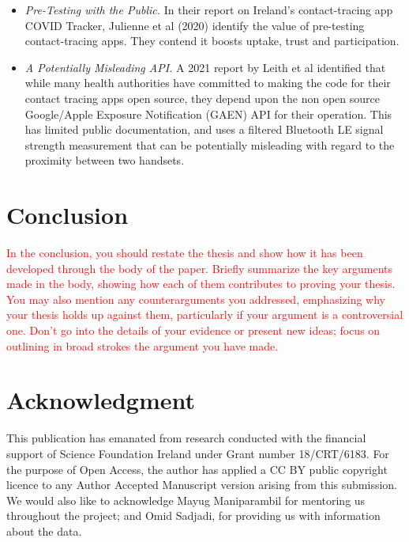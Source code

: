 \documentclass[conference]{IEEEtran}
\begin{document}
\begin{itemize}
\item {\emph{Pre-Testing with the Public.}}\cite{b6}
In their report on Ireland’s contact-tracing app COVID Tracker, Julienne et al (2020) identify the value of pre-testing contact-tracing apps. They contend it boosts uptake, trust and participation. 
\item {\emph{A Potentially Misleading API.}}\cite{b7}
A 2021 report by Leith et al identified that while many health authorities have committed to making the code for their contact tracing apps open source, they depend upon the non open source Google/Apple Exposure Notification (GAEN) API for their operation. This has limited public documentation, and uses a filtered Bluetooth LE signal strength measurement that can be potentially misleading with regard to the proximity between two handsets.


\end{itemize}

\section*{Conclusion}
\textcolor{red}{In the conclusion, you should restate the thesis and show how it has been developed through the body of the paper.
Briefly summarize the key arguments made in the body, showing how each of them contributes to proving your thesis. You may also mention any counterarguments you addressed, emphasizing why your thesis holds up against them, particularly if your argument is a controversial one.
Don’t go into the details of your evidence or present new ideas; focus on outlining in broad strokes the argument you have made.}

\section*{Acknowledgment}
This publication has emanated from research conducted with the financial
support of Science Foundation Ireland under Grant number 18/CRT/6183. For the purpose
of Open Access, the author has applied a CC BY public copyright licence to any
Author Accepted Manuscript version arising from this submission.\\
We would also like to acknowledge Mayug Maniparambil for mentoring us throughout the project; and Omid Sadjadi, for providing us with information about the data.
\end{document}
